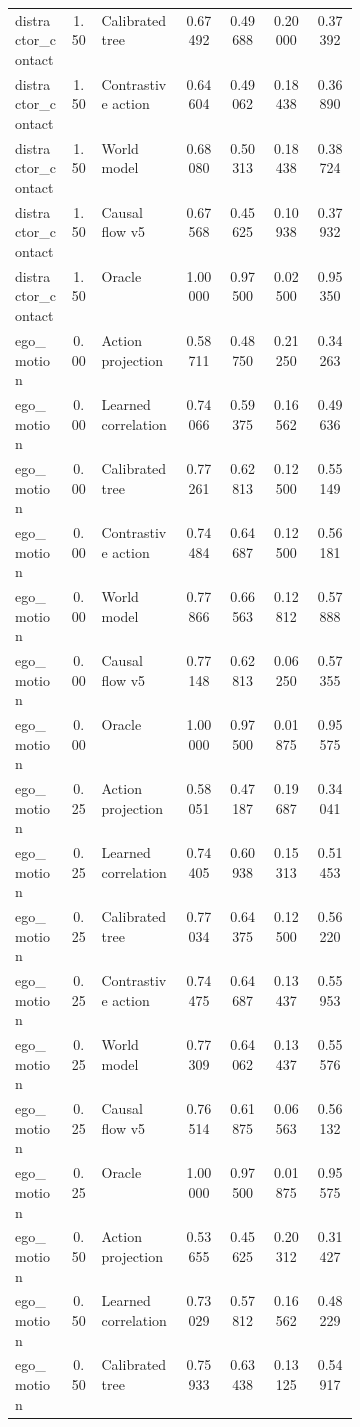 \documentclass{article}
\begin{document}
\begin{center}
\begin{longtable}{p{0.16\linewidth}cp{0.24\linewidth}cccc}
distractor\_contact & 1.50 & Calibrated tree & 0.67492 & 0.49688 & 0.20000 & 0.37392\\
distractor\_contact & 1.50 & Contrastive action & 0.64604 & 0.49062 & 0.18438 & 0.36890\\
distractor\_contact & 1.50 & World model & 0.68080 & 0.50313 & 0.18438 & 0.38724\\
distractor\_contact & 1.50 & Causal flow v5 & 0.67568 & 0.45625 & 0.10938 & 0.37932\\
distractor\_contact & 1.50 & Oracle & 1.00000 & 0.97500 & 0.02500 & 0.95350\\
ego\_motion & 0.00 & Action projection & 0.58711 & 0.48750 & 0.21250 & 0.34263\\
ego\_motion & 0.00 & Learned correlation & 0.74066 & 0.59375 & 0.16562 & 0.49636\\
ego\_motion & 0.00 & Calibrated tree & 0.77261 & 0.62813 & 0.12500 & 0.55149\\
ego\_motion & 0.00 & Contrastive action & 0.74484 & 0.64687 & 0.12500 & 0.56181\\
ego\_motion & 0.00 & World model & 0.77866 & 0.66563 & 0.12812 & 0.57888\\
ego\_motion & 0.00 & Causal flow v5 & 0.77148 & 0.62813 & 0.06250 & 0.57355\\
ego\_motion & 0.00 & Oracle & 1.00000 & 0.97500 & 0.01875 & 0.95575\\
ego\_motion & 0.25 & Action projection & 0.58051 & 0.47187 & 0.19687 & 0.34041\\
ego\_motion & 0.25 & Learned correlation & 0.74405 & 0.60938 & 0.15313 & 0.51453\\
ego\_motion & 0.25 & Calibrated tree & 0.77034 & 0.64375 & 0.12500 & 0.56220\\
ego\_motion & 0.25 & Contrastive action & 0.74475 & 0.64687 & 0.13437 & 0.55953\\
ego\_motion & 0.25 & World model & 0.77309 & 0.64062 & 0.13437 & 0.55576\\
ego\_motion & 0.25 & Causal flow v5 & 0.76514 & 0.61875 & 0.06563 & 0.56132\\
ego\_motion & 0.25 & Oracle & 1.00000 & 0.97500 & 0.01875 & 0.95575\\
ego\_motion & 0.50 & Action projection & 0.53655 & 0.45625 & 0.20312 & 0.31427\\
ego\_motion & 0.50 & Learned correlation & 0.73029 & 0.57812 & 0.16562 & 0.48229\\
ego\_motion & 0.50 & Calibrated tree & 0.75933 & 0.63438 & 0.13125 & 0.54917\\

\end{longtable}
\end{center}
\end{document}
